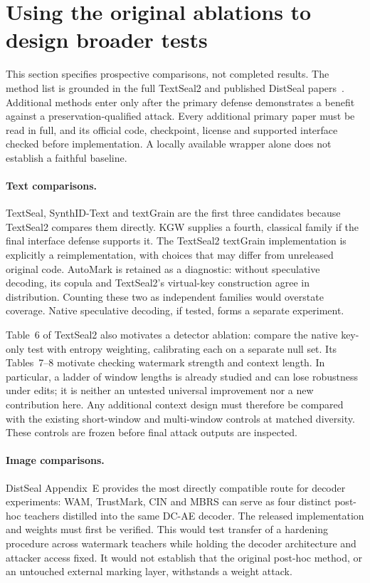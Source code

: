 \section{Using the original ablations to design broader tests}
\label{sec:cross_method_design}
This section specifies prospective comparisons, not completed results. The method list is grounded in the full TextSeal2 and published DistSeal papers~\citep{textseal2,distseal}. Additional methods enter only after the primary defense demonstrates a benefit against a preservation-qualified attack. Every additional primary paper must be read in full, and its official code, checkpoint, license and supported interface checked before implementation. A locally available wrapper alone does not establish a faithful baseline.

\paragraph{Text comparisons.} TextSeal, SynthID-Text and textGrain are the first three candidates because TextSeal2 compares them directly. KGW supplies a fourth, classical family if the final interface defense supports it. The TextSeal2 textGrain implementation is explicitly a reimplementation, with choices that may differ from unreleased original code. AutoMark is retained as a diagnostic: without speculative decoding, its copula and TextSeal2's virtual-key construction agree in distribution. Counting these two as independent families would overstate coverage. Native speculative decoding, if tested, forms a separate experiment.

Table~6 of TextSeal2 also motivates a detector ablation: compare the native key-only test with entropy weighting, calibrating each on a separate null set. Its Tables~7--8 motivate checking watermark strength and context length. In particular, a ladder of window lengths is already studied and can lose robustness under edits; it is neither an untested universal improvement nor a new contribution here. Any additional context design must therefore be compared with the existing short-window and multi-window controls at matched diversity. These controls are frozen before final attack outputs are inspected.

\paragraph{Image comparisons.} DistSeal Appendix~E provides the most directly compatible route for decoder experiments: WAM, TrustMark, CIN and MBRS can serve as four distinct post-hoc teachers distilled into the same DC-AE decoder. The released implementation and weights must first be verified. This would test transfer of a hardening procedure across watermark teachers while holding the decoder architecture and attacker access fixed. It would not establish that the original post-hoc method, or an untouched external marking layer, withstands a weight attack.

